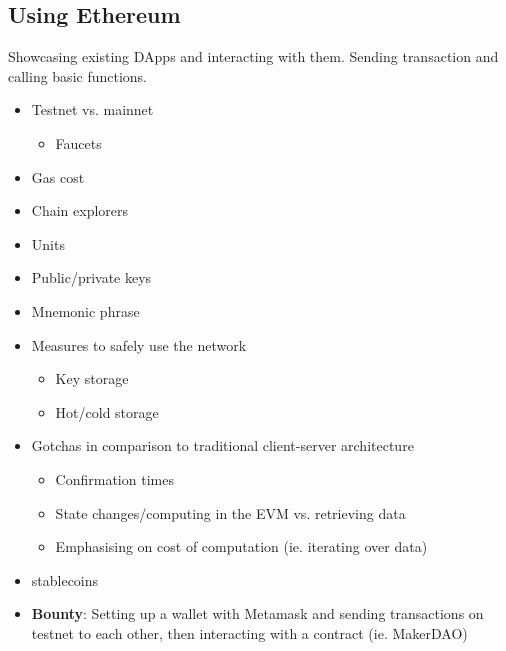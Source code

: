 \subsection{Using Ethereum}
Showcasing existing DApps and interacting with them. Sending transaction and calling basic functions. 
\begin{itemize}
    \item Testnet vs. mainnet 
    \begin{itemize}
        \item Faucets
    \end{itemize}
    \item Gas cost
    \item Chain explorers
    \item Units
    \item Public/private keys
    \item Mnemonic phrase
    \item Measures to safely use the network
    \begin{itemize}
        \item Key storage
        \item Hot/cold storage
    \end{itemize}
    \item Gotchas in comparison to traditional client-server architecture
    \begin{itemize}
        \item Confirmation times
        \item State changes/computing in the EVM vs. retrieving data
        \item Emphasising on cost of computation (ie. iterating over data)
    \end{itemize}
    \item stablecoins
    \item \textbf{Bounty}: Setting up a wallet with Metamask and sending transactions on testnet to each other, then interacting with a contract (ie. MakerDAO)
\end{itemize}